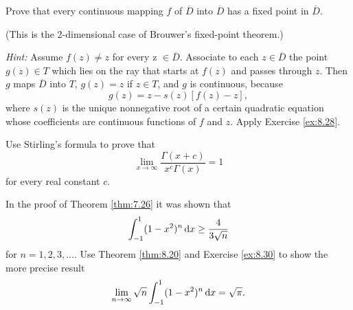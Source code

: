 \begin{myexercise}
    \label{ex:8.29}
    Prove that every continuous mapping $f$ of $\overline{D}$ into $\overline{D}$ has a fixed point in $\overline{D}$.

    (This is the 2-dimensional case of Brouwer's fixed-point theorem.)

    \emph{Hint:} Assume $f(z) \neq  z$ for every z $\in \overline{D}$.
    Associate to each $z \in \overline{D}$ the point
    $g(z) \in T$ which lies on the ray that starts at $f(z)$ and passes through $z$.
    Then $g$ maps $\overline{D}$ into $T$, $g(z) = z$ if $z \in T$, and $g$ is continuous, because
    \begin{equation*}
        g(z) = z - s(z)[f(z) - z],
    \end{equation*}
    where $s(z)$ is the unique nonnegative root of a certain
    quadratic equation whose coefficients are continuous functions of $f$ and $z$.
    Apply Exercise \ref{ex:8.28}.
\end{myexercise}


\begin{myexercise}
    \label{ex:8.30}
    Use Stirling's formula to prove that
    \begin{equation*}
        \lim_{x \to \infty} \frac{\Gamma(x+c)}{x^c \Gamma(x)} = 1
    \end{equation*}
    for every real constant $c$.
\end{myexercise}


\begin{myexercise}
    \label{ex:8.31}
    In the proof of Theorem \ref{thm:7.26} it was shown that
    \begin{equation*}
        \int_{-1}^{1} (1-x^2)^n \d x \geq \frac{4}{3\sqrt{n}}
    \end{equation*}
    for $n = 1, 2, 3, ...$. Use Theorem \ref{thm:8.20} and Exercise \ref{ex:8.30} to show the more precise result
    \begin{equation*}
        \lim_{n \to \infty} \sqrt{n} \int_{-1}^{1} (1-x^2)^n \d x = \sqrt{\pi} .
    \end{equation*}
\end{myexercise}